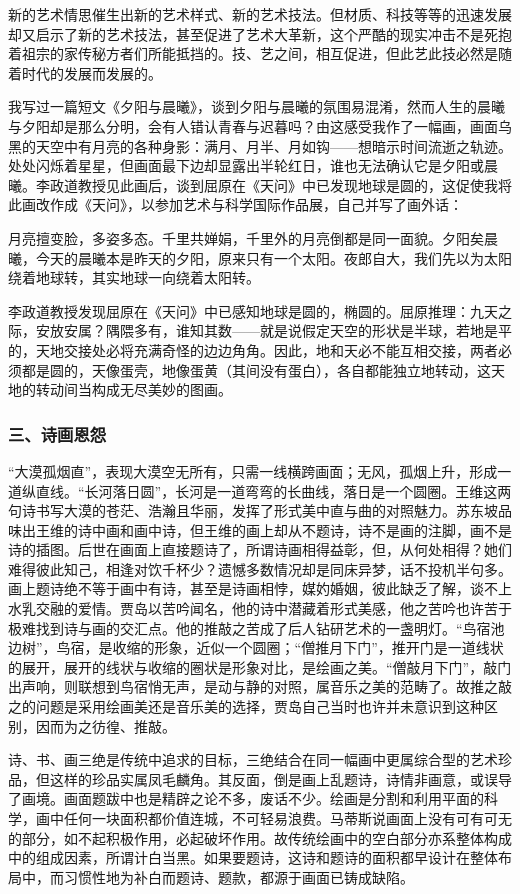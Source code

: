 \documentclass{article}
\begin{document}
新的艺术情思催生出新的艺术样式、新的艺术技法。但材质、科技等等的迅速发展却又启示了新的艺术技法，甚至促进了艺术大革新，这个严酷的现实冲击不是死抱着祖宗的家传秘方者们所能抵挡的。技、艺之间，相互促进，但此艺此技必然是随着时代的发展而发展的。

我写过一篇短文《夕阳与晨曦》，谈到夕阳与晨曦的氛围易混淆，然而人生的晨曦与夕阳却是那么分明，会有人错认青春与迟暮吗？由这感受我作了一幅画，画面乌黑的天空中有月亮的各种身影：满月、月半、月如钩——想暗示时间流逝之轨迹。处处闪烁着星星，但画面最下边却显露出半轮红日，谁也无法确认它是夕阳或晨曦。李政道教授见此画后，谈到屈原在《天问》中已发现地球是圆的，这促使我将此画改作成《天问》，以参加艺术与科学国际作品展，自己并写了画外话：

月亮擅变脸，多姿多态。千里共婵娟，千里外的月亮倒都是同一面貌。夕阳矣晨曦，今天的晨曦本是昨天的夕阳，原来只有一个太阳。夜郎自大，我们先以为太阳绕着地球转，其实地球一向绕着太阳转。

李政道教授发现屈原在《天问》中已感知地球是圆的，椭圆的。屈原推理：九天之际，安放安属？隅隈多有，谁知其数——就是说假定天空的形状是半球，若地是平的，天地交接处必将充满奇怪的边边角角。因此，地和天必不能互相交接，两者必须都是圆的，天像蛋壳，地像蛋黄（其间没有蛋白），各自都能独立地转动，这天地的转动间当构成无尽美妙的图画。
\subsubsection{三、诗画恩怨}
“大漠孤烟直”，表现大漠空无所有，只需一线横跨画面；无风，孤烟上升，形成一道纵直线。“长河落日圆”，长河是一道弯弯的长曲线，落日是一个圆圈。王维这两句诗书写大漠的苍茫、浩瀚且华丽，发挥了形式美中直与曲的对照魅力。苏东坡品味出王维的诗中画和画中诗，但王维的画上却从不题诗，诗不是画的注脚，画不是诗的插图。后世在画面上直接题诗了，所谓诗画相得益彰，但，从何处相得？她们难得彼此知己，相逢对饮千杯少？遗憾多数情况却是同床异梦，话不投机半句多。画上题诗绝不等于画中有诗，甚至是诗画相悖，媒妁婚姻，彼此缺乏了解，谈不上水乳交融的爱情。贾岛以苦吟闻名，他的诗中潜藏着形式美感，他之苦吟也许苦于极难找到诗与画的交汇点。他的推敲之苦成了后人钻研艺术的一盏明灯。“鸟宿池边树”，鸟宿，是收缩的形象，近似一个圆圈；“僧推月下门”，推开门是一道线状的展开，展开的线状与收缩的圈状是形象对比，是绘画之美。“僧敲月下门”，敲门出声响，则联想到鸟宿悄无声，是动与静的对照，属音乐之美的范畴了。故推之敲之的问题是采用绘画美还是音乐美的选择，贾岛自己当时也许并未意识到这种区别，因而为之彷徨、推敲。

诗、书、画三绝是传统中追求的目标，三绝结合在同一幅画中更属综合型的艺术珍品，但这样的珍品实属凤毛麟角。其反面，倒是画上乱题诗，诗情非画意，或误导了画境。画面题跋中也是精辟之论不多，废话不少。绘画是分割和利用平面的科学，画中任何一块面积都价值连城，不可轻易浪费。马蒂斯说画面上没有可有可无的部分，如不起积极作用，必起破坏作用。故传统绘画中的空白部分亦系整体构成中的组成因素，所谓计白当黑。如果要题诗，这诗和题诗的面积都早设计在整体布局中，而习惯性地为补白而题诗、题款，都源于画面已铸成缺陷。
\end{document}

